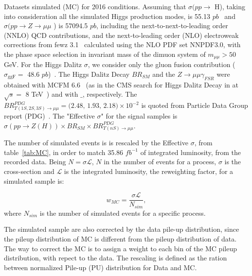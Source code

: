 \begin{table}[htp]
\begin{center}

\caption{Datasets simulated (MC) for 2016 conditions. Assuming that $\sigma (pp\rightarrow$ H), taking into consideration all the simulated Higgs production modes, is 55.13 $pb$~\cite{CERNYellowReportPageAt13TeV} and  $\sigma (pp\rightarrow Z \rightarrow \mu\mu$ ) is 57094.5 $pb$, including the next-to-next-to-leading order
(NNLO) QCD contributions, and the next-to-leading order (NLO) electroweak corrections from fewz 3.1~\cite{FEWZ} calculated using the NLO PDF set NNPDF3.0, with the phase space selection in invariant mass of the dimuon system of $m_{\mu\mu} > 50$ GeV. For the Higgs Dalitz $\sigma$, we consider only the gluon fusion contribution ($\sigma_{\text{ggF}}  = $ 48.6 $pb$)~\cite{CERNYellowReportPageAt13TeV}. The Higgs Dalitz Decay $BR_{SM}$ and the $Z \rightarrow \mu\mu\gamma_{FSR}$ were obtained with MCFM 6.6~\cite{CAMPBELL201010} (as in the CMS search for Higgs Dalitz Decay in at $\sqrt{s} =$ 8 TeV~\cite{dalitz_decay_8_Tev}) and with  $\_$\MCATNLO, respectively. The $BR^{PDG}_{\Upsilon(1S,2S,3S) \rightarrow \mu\mu} = \text{(2.48, 1.93, 2.18)} \times 10^{-2}$ is quoted from Particle Data Group report (PDG)~\cite{Patrignani:2016xqp}. The "Effective $\sigma$" for the signal samples is $\sigma(pp \rightarrow Z(H)) \times BR_{SM} \times BR^{PDG}_{\Upsilon(nS) \rightarrow \mu\mu}$.}
\label{tab:MC}
\end{center}
\end{table}

The number of simulated events is is rescaled by the Effective $\sigma$, from table~\ref{tab:MC}, in order to match 35.86 $fb^{-1}$ of integrated luminosity, from the recorded data. Being $N = \sigma \mathcal{L}$, $N$ in the number of events for a process, $\sigma$ is the cross-section and $\mathcal{L}$ is the integrated luminosity, the reweighting factor, for a simulated sample is:

\begin{equation}
\label{eqn:mc_weight}
w_{MC} = \frac{\sigma \mathcal{L}}{N_{sim}},
\end{equation}
where $N_{sim}$ is the number of simulated events for a specific process.

The simulated sample are also corrected by the data pile-up distribution, since the pileup distribution of MC is different from the pileup distribution of data. The way to correct the MC is to assign a weight to each bin of the MC pileup distribution, with repect to the data. The rescaling is defined as the ration between normalized Pile-up (PU) distribution for Data and MC.


